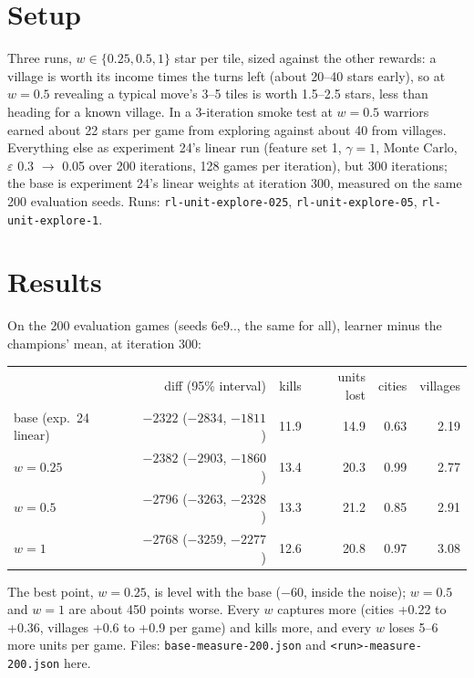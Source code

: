 \documentclass{../polyexp}
\begin{document}
\section{Setup}
Three runs, $w \in \{0.25, 0.5, 1\}$ star per tile, sized against the other rewards: a village is worth its income
times the turns left (about 20--40 stars early), so at $w = 0.5$ revealing a typical move's 3--5 tiles is worth
1.5--2.5 stars, less than heading for a known village. In a 3-iteration smoke test at $w = 0.5$ warriors earned about
22 stars per game from exploring against about 40 from villages. Everything else as experiment 24's linear run
(feature set 1, $\gamma = 1$, Monte Carlo, $\varepsilon$ 0.3 $\to$ 0.05 over 200 iterations, 128 games per
iteration), but 300 iterations; the base is experiment 24's linear weights at iteration 300, measured on the same
200 evaluation seeds. Runs: \texttt{rl-unit-explore-025}, \texttt{rl-unit-explore-05}, \texttt{rl-unit-explore-1}.

\section{Results}
\ExpResults

On the 200 evaluation games (seeds 6e9.., the same for all), learner minus the champions' mean, at iteration 300:
\begin{center}\begin{tabular}{lrrrrr}
 & diff (95\% interval) & kills & units lost & cities & villages \\
base (exp.\ 24 linear) & $-2322$ ($-2834$, $-1811$) & 11.9 & 14.9 & 0.63 & 2.19 \\
$w = 0.25$ & $-2382$ ($-2903$, $-1860$) & 13.4 & 20.3 & 0.99 & 2.77 \\
$w = 0.5$ & $-2796$ ($-3263$, $-2328$) & 13.3 & 21.2 & 0.85 & 2.91 \\
$w = 1$ & $-2768$ ($-3259$, $-2277$) & 12.6 & 20.8 & 0.97 & 3.08 \\
\end{tabular}\end{center}
The best point, $w = 0.25$, is level with the base ($-60$, inside the noise); $w = 0.5$ and $w = 1$ are about 450 points
worse. Every $w$ captures more (cities +0.22 to +0.36, villages +0.6 to +0.9 per game) and kills more, and every $w$
loses 5--6 more units per game. Files: \texttt{base-measure-200.json} and \texttt{<run>-measure-200.json} here.
\end{document}
